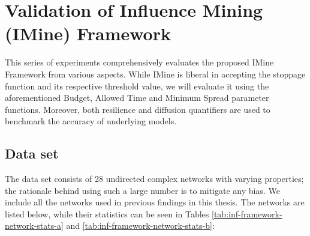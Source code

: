	\section{Validation of Influence Mining (IMine) Framework}
	\label{sec:inf-framework-validation}
	This series of experiments comprehensively evaluates the proposed IMine Framework from various aspects. While IMine is liberal in accepting the stoppage function and its respective threshold value, we will evaluate it using the aforementioned Budget, Allowed Time and Minimum Spread parameter functions. Moreover, both resilience and diffusion quantifiers are used to benchmark the accuracy of underlying models.
	
		\subsection{Data set}
		The data set consists of 28 undirected complex networks with varying properties; the rationale behind using such a large number is to mitigate any bias. We include all the networks used in previous findings in this thesis. The networks are listed below, while their statistics can be seen in Tables \ref{tab:inf-framework-network-stats-a} and \ref{tab:inf-framework-network-stats-b}:
		
